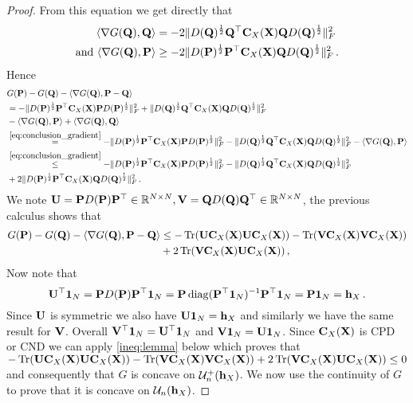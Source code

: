 \begin{proof}
	From this equation we get directly that 
	\begin{equation}
		\label{eq:conclusion_gradient}
		\begin{split}
			\langle \nabla G({\mathbf{Q}}), {\mathbf{Q}} \rangle &= -2 \|D({\mathbf{Q}})^{\frac{1}{2}} {\mathbf{Q}}^\top{\mathbf{C}}_{X}({\mathbf{X}}) {\mathbf{Q}}  D({\mathbf{Q}})^{\frac{1}{2}}\|_F^2 \\ 
			\text{ and } \langle \nabla G({\mathbf{Q}}), {\mathbf{P}} \rangle  & \geq -2 \|D({\mathbf{P}})^{\frac{1}{2}} {\mathbf{P}}^\top{\mathbf{C}}_{X}({\mathbf{X}}) {\mathbf{Q}}  D({\mathbf{Q}})^{\frac{1}{2}}\|_F^2\,.\
		\end{split}
	\end{equation}
	Hence
	\begin{equation}
		\begin{split}
			&G(\mP) - G(\mQ) - \langle \nabla G(\mQ), \mP -\mQ \rangle\\
			 &=- \|D(\mP)^{\frac{1}{2}} \mP^\top \simiX(\mX) \mP D(\mP)^{\frac{1}{2}}\|_F^2+\|D(\mQ)^{\frac{1}{2}} \mQ^\top \simiX(\mX) \mQ D(\mQ)^{\frac{1}{2}}\|_F^2 \\
			&- \langle \nabla G(\mQ), \mP \rangle + \langle \nabla G(\mQ), \mQ \rangle \\
			&\stackrel{\cref{eq:conclusion_gradient}}{=}- \|D(\mP)^{\frac{1}{2}} \mP^\top \simiX(\mX) \mP D(\mP)^{\frac{1}{2}}\|_F^2-\|D(\mQ)^{\frac{1}{2}} \mQ^\top \simiX(\mX) \mQ D(\mQ)^{\frac{1}{2}}\|_F^2 - \langle \nabla G(\mQ), \mP \rangle \\
			&\stackrel{\cref{eq:conclusion_gradient}}{\leq} - \|D(\mP)^{\frac{1}{2}} \mP^\top \simiX(\mX) \mP D(\mP)^{\frac{1}{2}}\|_F^2-\|D(\mQ)^{\frac{1}{2}} \mQ^\top \simiX(\mX) \mQ D(\mQ)^{\frac{1}{2}}\|_F^2 \\
			&+2 \|D(\mP)^{\frac{1}{2}} \mP^\top\simiX(\mX) \mQ  D(\mQ)^{\frac{1}{2}}\|_F^2\,. \\
		\end{split}
	\end{equation}
	We note ${\mathbf{U}} = {\mathbf{P}} D({\mathbf{P}}){\mathbf{P}}^\top \in \mathbb{R}^{N \times N}, {\mathbf{V}} = {\mathbf{Q}} D({\mathbf{Q}}){\mathbf{Q}}^\top \in \mathbb{R}^{N \times N}$, the previous calculus shows that
	\begin{equation}
		\begin{split}
			G({\mathbf{P}}) - G({\mathbf{Q}}) - \langle \nabla G({\mathbf{Q}}), {\mathbf{P}} -{\mathbf{Q}} \rangle &\leq - \operatorname{Tr}({\mathbf{U}} {\mathbf{C}}_{X}({\mathbf{X}}) {\mathbf{U}} {\mathbf{C}}_{X}({\mathbf{X}}))- \operatorname{Tr}({\mathbf{V}} {\mathbf{C}}_{X}({\mathbf{X}}) {\mathbf{V}} {\mathbf{C}}_{X}({\mathbf{X}}))\\
			&+2 \operatorname{Tr}({\mathbf{V}} {\mathbf{C}}_{X}({\mathbf{X}}) {\mathbf{U}} {\mathbf{C}}_{X}({\mathbf{X}}))\,,
		\end{split}
	\end{equation}
	Now note that
	\begin{equation}
		{\mathbf{U}}^\top \bm{1}_N = {\mathbf{P}} D({\mathbf{P}}) {\mathbf{P}}^\top \bm{1}_N = {\mathbf{P}} \operatorname{diag}({\mathbf{P}}^\top \bm{1}_N)^{-1} {\mathbf{P}}^\top \bm{1}_N = {\mathbf{P}} \bm{1}_N = {\mathbf{h}}_X\,.
	\end{equation}
	Since ${\mathbf{U}}$ is symmetric we also have ${\mathbf{U}} \bm{1}_N = {\mathbf{h}}_X$ and similarly we have the same result for ${\mathbf{V}}$. Overall ${\mathbf{V}}^\top \bm{1}_N = {\mathbf{U}}^\top \bm{1}_N$ and ${\mathbf{V}} \bm{1}_N = {\mathbf{U}} \bm{1}_N$. Since ${\mathbf{C}}_{X}({\mathbf{X}})$ is CPD or CND we can apply \cref{ineq:lemma} below which proves that $- \operatorname{Tr}({\mathbf{U}} {\mathbf{C}}_{X}({\mathbf{X}}) {\mathbf{U}} {\mathbf{C}}_{X}({\mathbf{X}}))- \operatorname{Tr}({\mathbf{V}} {\mathbf{C}}_{X}({\mathbf{X}}) {\mathbf{V}} {\mathbf{C}}_{X}({\mathbf{X}}))+2 \operatorname{Tr}({\mathbf{V}} {\mathbf{C}}_{X}({\mathbf{X}}) {\mathbf{U}} {\mathbf{C}}_{X}({\mathbf{X}})) \leq 0$ and consequently that $G$ is concave on ${\mathcal{U}}^{+}_n({\mathbf{h}}_X)$. We now use the continuity of $G$ to prove that it is concave on ${\mathcal{U}}_n({\mathbf{h}}_X)$.
	

\end{proof}
